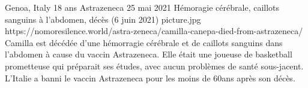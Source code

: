           {Genoa, Italy}
          {18 ans}
          {Astrazeneca}
          {25 mai 2021}
          {Hémoragie cérébrale, caillots sanguins à l'abdomen, décès (6 juin 2021)}
          {picture.jpg}
          {https://nomoresilence.world/astra-zeneca/camilla-canepa-died-from-astrazeneca/}
          {
Camilla est décédée d'une hémorragie cérébrale et de caillots sanguins dans
l'abdomen à cause du vaccin Astrazeneca. Elle était une joueuse de basketball
prometteuse qui préparait ses études, avec aucun problèmes de santé
sous-jacent. L'Italie a banni le vaccin Astrazeneca pour les moins de 60ans
après son décès.
}
